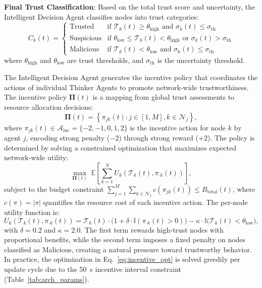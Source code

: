 \documentclass[notspecified,article,submit,moreauthors]{Definitions/mdpi}
\begin{document}
\textbf{Final Trust Classification}: Based on the total trust score and uncertainty, the Intelligent Decision Agent classifies nodes into trust categories:
\begin{equation}\label{eq:ida_classification}
C_k(t) =
\begin{cases}
\text{Trusted} & \text{if } \mathcal{T}_k(t) \geq \theta_{\text{high}} \text{ and } \sigma_k(t) \leq \sigma_{\text{th}} \\
\text{Suspicious} & \text{if } \theta_{\text{low}} \leq \mathcal{T}_k(t) < \theta_{\text{high}} \text{ or } \sigma_k(t) > \sigma_{\text{th}} \\
\text{Malicious} & \text{if } \mathcal{T}_k(t) < \theta_{\text{low}} \text{ and } \sigma_k(t) \leq \sigma_{\text{th}}
\end{cases}
\end{equation}
where $\theta_{\text{high}}$ and $\theta_{\text{low}}$ are trust thresholds, and $\sigma_{\text{th}}$ is the uncertainty threshold.

The Intelligent Decision Agent generates the incentive policy that coordinates the actions of individual Thinker Agents to promote network-wide trustworthiness. The incentive policy $\boldsymbol{\Pi}(t)$ is a mapping from global trust assessments to resource allocation decisions:
\begin{equation}\label{eq:incentive_policy}
\boldsymbol{\Pi}(t) = \left\{ \pi_{jk}(t) : j \in [1, M], k \in \mathcal{N}_j \right\},
\end{equation}
where $\pi_{jk}(t) \in \mathcal{A}_{\text{inc}} = \{-2, -1, 0, 1, 2\}$ is the incentive action for node $k$ by agent $j$, encoding strong penalty ($-2$) through strong reward ($+2$). The policy is determined by solving a constrained optimization that maximizes expected network-wide utility:
\begin{equation}\label{eq:incentive_opt}
\max_{\boldsymbol{\Pi}(t)}\; \mathbb{E}\left[ \sum_{k=1}^{N} U_k\!\left( \mathcal{T}_k(t), \pi_{\cdot k}(t) \right) \right],
\end{equation}
subject to the budget constraint $\sum_{j=1}^{M} \sum_{k \in \mathcal{N}_j} c(\pi_{jk}(t)) \leq B_{\text{total}}(t)$, where $c(\pi) = |\pi|$ quantifies the resource cost of each incentive action. The per-node utility function is:
\begin{equation}\label{eq:utility}
U_k\!\left( \mathcal{T}_k(t), \pi_{\cdot k}(t) \right) = \mathcal{T}_k(t) \cdot \bigl(1 + \delta \cdot \mathbb{I}(\pi_{\cdot k}(t) > 0)\bigr) - \kappa \cdot \mathbb{I}\bigl(\mathcal{T}_k(t) < \theta_{\text{low}}\bigr),
\end{equation}
with $\delta = 0.2$ and $\kappa = 2.0$. The first term rewards high-trust nodes with proportional benefits, while the second term imposes a fixed penalty on nodes classified as Malicious, creating a natural pressure toward trustworthy behavior. In practice, the optimization in Eq.~\ref{eq:incentive_opt} is solved greedily per update cycle due to the 50~s incentive interval constraint (Table~\ref{tab:arch_params}).
\end{document}
